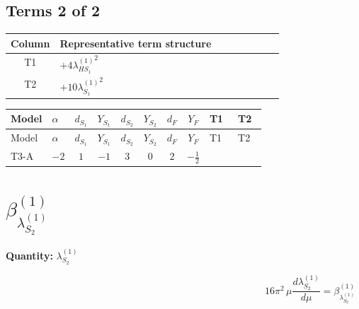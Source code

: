 \documentclass[8pt]{article}
\begin{document}
\begin{landscape}
\subsection*{Terms 2 of 2}
\begin{center}
\begin{tabular}{@{}c >{\raggedright\arraybackslash}p{0.82\linewidth}@{}}
\toprule
Column & Representative term structure \\
\midrule
T1 & \(\displaystyle +4 {\lambda_{HS_1}^{(1)}}^2\) \\
\midrule
T2 & \(\displaystyle +10 {\lambda_{S_1}^{(1)}}^2\) \\
\midrule
\bottomrule
\end{tabular}
\end{center}
\smallskip
\tiny
\begin{longtable}{@{}llcccccc >{\raggedright\arraybackslash}p{0.21\linewidth} >{\raggedright\arraybackslash}p{0.21\linewidth}@{}}
\toprule
Model & $\alpha$ & $d_{S_1}$ & $Y_{S_1}$ & $d_{S_2}$ & $Y_{S_2}$ & $d_F$ & $Y_F$ & T1 & T2 \\
\midrule
\endfirsthead
\toprule
Model & $\alpha$ & $d_{S_1}$ & $Y_{S_1}$ & $d_{S_2}$ & $Y_{S_2}$ & $d_F$ & $Y_F$ & T1 & T2 \\
\midrule
\endhead
T3-A & $-2$ & $1$ & $-1$ & $3$ & $0$ & $2$ & $-\frac{1}{2}$ & \scriptsize\adjustbox{max width=\linewidth}{$\begin{gathered} +4 {\lambda_{HS_1}^{(1)}}^2\end{gathered}$} & \scriptsize\adjustbox{max width=\linewidth}{$\begin{gathered} +10 {\lambda_{S_1}^{(1)}}^2\end{gathered}$} \\
\midrule
\bottomrule
\end{longtable}
\clearpage
\section*{$\beta_{\lambda_{S_2}^{(1)}}^{(1)}$}
\noindent\textbf{Quantity: }$\lambda_{S_2}^{(1)}$\par\smallskip
\[16\pi^2\,\mu\frac{d \lambda_{S_2}^{(1)}}{d\mu}=\beta_{\lambda_{S_2}^{(1)}}^{(1)}\]

\end{landscape}
\end{document}
